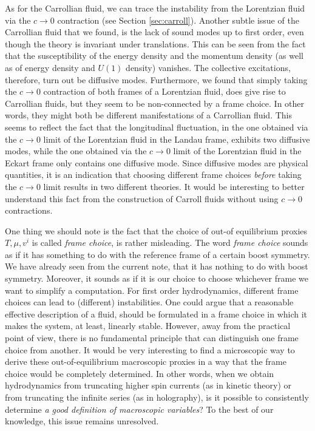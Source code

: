 \documentclass[superscriptaddress,prd,nofootinbib,preprintnumbers,longbibliography,11pt,eqsecnum]{revtex4-1}
\begin{document}
As for the Carrollian fluid, we can trace the instability from the Lorentzian fluid via the $c\to 0$ contraction (see Section \ref{sec:carroll}). Another subtle issue of the Carrollian fluid that we found, is the lack of sound modes up to first order, even though the theory is invariant under translations. This can be seen from the fact that the susceptibility of the energy density and the momentum density (as well as of energy density and $U(1)$ density) vanishes. The collective excitations, therefore, turn out be diffusive modes. Furthermore, we found that simply taking the $c\to0$ contraction of both frames of a Lorentzian fluid, does give rise to Carrollian fluids, but they seem to be non-connected by a frame choice. In other words, they might both be different manifestations of a Carrollian fluid. This seems to reflect the fact that  the longitudinal fluctuation, in the one obtained via the $c\to 0$ limit of the Lorentzian fluid in the Landau frame, exhibits two diffusive modes, while the one obtained via the $c\to 0$ limit of the Lorentzian fluid in the Eckart frame only contains one diffusive mode. Since diffusive modes are physical quantities, it is an indication that choosing different frame choices \textit{before} taking the $c\to 0$ limit results in two different theories. It would be interesting to better understand this fact from the construction of Carroll fluids without using $c\to0$ contractions.


One thing we should note is the fact that the choice of out-of equilibrium proxies $T,\mu,v^i$ is called \textit{frame choice}, is rather misleading. The word \textit{frame choice} sounds as if it has something to do with the reference frame of a certain boost symmetry. We have already seen from the current note, that it has nothing to do with boost symmetry. Moreover, it sounds as if it is our choice to choose whichever frame we want to simplify a computation. For first order hydrodynamics, different frame choices can lead to (different) instabilities. One could argue that a reasonable effective description of a fluid, should be formulated in a frame choice in which it makes the system, at least, linearly stable. However, away from the practical point of view, there is no fundamental principle that can distinguish one frame choice from another. It would be very interesting to find a microscopic way to derive these out-of-equilibrium macroscopic proxies in a way that the frame choice would be completely determined. In other words, when we obtain hydrodynamics from truncating higher spin currents (as in kinetic theory) or from truncating the infinite series (as in holography), is it possible to consistently determine \textit{a good definition of macroscopic variables}? To the best of our knowledge, this issue remains unresolved.
\end{document}

